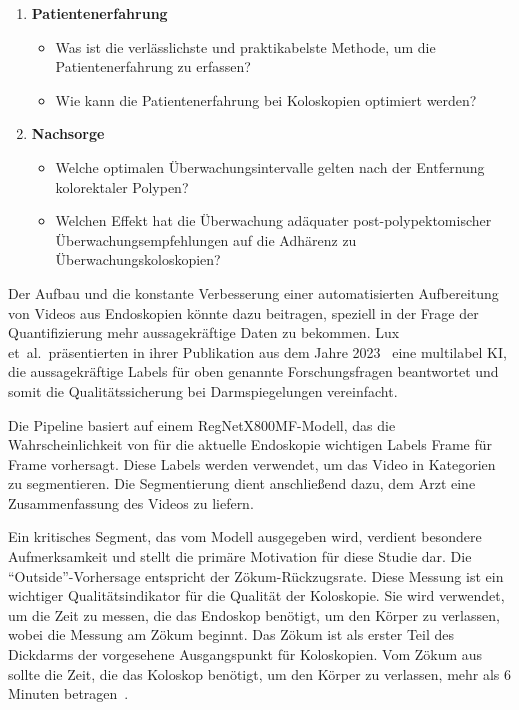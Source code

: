 \begin{enumerate}
  \item \textbf{Patientenerfahrung}
    \begin{itemize}
      \item Was ist die verlässlichste und praktikabelste Methode, um die Patientenerfahrung zu erfassen?
      \item Wie kann die Patientenerfahrung bei Koloskopien optimiert werden?
    \end{itemize}

  \item \textbf{Nachsorge}
    \begin{itemize}
      \item Welche optimalen Überwachungsintervalle gelten nach der Entfernung kolorektaler Polypen?
      \item Welchen Effekt hat die Überwachung adäquater post-polypektomischer Überwachungsempfehlungen auf die Adhärenz zu Überwachungskoloskopien?
    \end{itemize}
\end{enumerate}

Der Aufbau und die konstante Verbesserung einer automatisierten Aufbereitung von Videos aus Endoskopien könnte dazu beitragen, speziell in der Frage der Quantifizierung mehr aussagekräftige Daten zu bekommen. Lux et~al.\ präsentierten in ihrer Publikation aus dem Jahre 2023~\citep{lux-2023} eine multilabel KI, die aussagekräftige Labels für oben genannte Forschungsfragen beantwortet und somit die Qualitätssicherung bei Darmspiegelungen vereinfacht.

Die Pipeline basiert auf einem RegNetX800MF-Modell, das die Wahrscheinlichkeit von für die aktuelle Endoskopie wichtigen Labels Frame für Frame vorhersagt. Diese Labels werden verwendet, um das Video in Kategorien zu segmentieren. Die Segmentierung dient anschließend dazu, dem Arzt eine Zusammenfassung des Videos zu liefern.

Ein kritisches Segment, das vom Modell ausgegeben wird, verdient besondere Aufmerksamkeit und stellt die primäre Motivation für diese Studie dar. Die \enquote{Outside}-Vorhersage entspricht der Zökum-Rückzugsrate. Diese Messung ist ein wichtiger Qualitätsindikator für die Qualität der Koloskopie. Sie wird verwendet, um die Zeit zu messen, die das Endoskop benötigt, um den Körper zu verlassen, wobei die Messung am Zökum beginnt. Das Zökum ist als erster Teil des Dickdarms der vorgesehene Ausgangspunkt für Koloskopien. Vom Zökum aus sollte die Zeit, die das Koloskop benötigt, um den Körper zu verlassen, mehr als 6 Minuten betragen~\citep{profanter-2020,leung-2019}.


